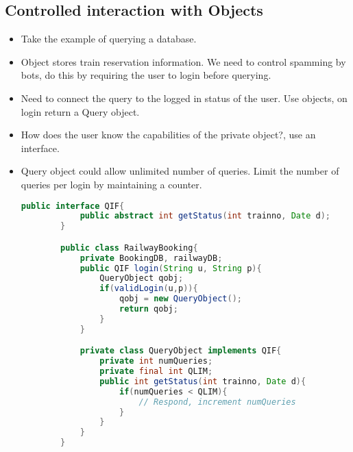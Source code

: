 \documentclass[a4paper]{article}
\begin{document}
\subsection{Controlled interaction with Objects}
\begin{itemize}
    \item Take the example of querying a database.
    \item Object stores train reservation information. We need to control spamming by bots, do this by requiring the user to login before querying.
    \item Need to connect the query to the logged in status of the user. Use objects, on login return a Query object.
    \item How does the user know the capabilities of the private object?, use an interface.
    \item Query object could allow unlimited number of queries. Limit the number of queries per login by maintaining a counter.
    \begin{lstlisting}[language=Java]
        public interface QIF{
            public abstract int getStatus(int trainno, Date d);
        }

        public class RailwayBooking{
            private BookingDB, railwayDB;
            public QIF login(String u, String p){
                QueryObject qobj;
                if(validLogin(u,p)){
                    qobj = new QueryObject();
                    return qobj;
                }
            }

            private class QueryObject implements QIF{
                private int numQueries;
                private final int QLIM;
                public int getStatus(int trainno, Date d){
                    if(numQueries < QLIM){
                        // Respond, increment numQueries
                    }
                }
            }
        }
    \end{lstlisting}
\end{itemize}
\end{document}
